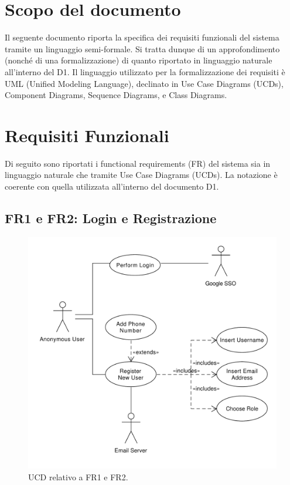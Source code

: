 \documentclass[9pt]{extarticle}
\begin{document}
\customtitle



\tableofcontents
\newpage

\section{Scopo del documento}


Il seguente documento riporta la specifica dei requisiti funzionali del sistema tramite un linguaggio semi-formale. Si tratta dunque di un approfondimento (nonché di una formalizzazione) di quanto riportato in linguaggio naturale all'interno del D1. Il linguaggio utilizzato per la formalizzazione dei requisiti è UML (Unified Modeling Language), declinato in Use Case Diagrams (UCDs), Component Diagrams, Sequence Diagrams, e Class Diagrams.

\newpage

\section{Requisiti Funzionali}

Di seguito sono riportati i functional requirements (FR) del sistema sia in linguaggio naturale che tramite Use Case Diagrams (UCDs). La notazione è coerente con quella utilizzata all'interno del documento D1.

\subsection{FR1 e FR2: Login e Registrazione} 

\begin{figure}[!htb]
	\centering
	\includegraphics[width=.7\linewidth]{./images/FR1-2.pdf}
	\caption{UCD relativo a FR1 e FR2.}
	\label{fig:UCD_FR1-2}
\end{figure}
\end{document}
